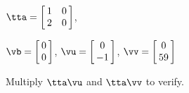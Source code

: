 {$\tta = \left[\hskip -3pt \begin{array}{cc} 1&0\\   2&0 \end{array}\hskip -3pt \right] $,
 
$\vb=\left[\hskip -3pt \begin{array}{c} 0\\   0 \end{array}\hskip -3pt \right] $, 
$\vu = \left[\hskip -3pt \begin{array}{c} 0\\ -1 \end{array}\hskip -3pt \right]$, $\vv = \left[\hskip -3pt \begin{array}{c} 0\\ 59 \end{array}\hskip -3pt \right] $}
{Multiply $\tta\vu$ and $\tta\vv$ to verify.}




